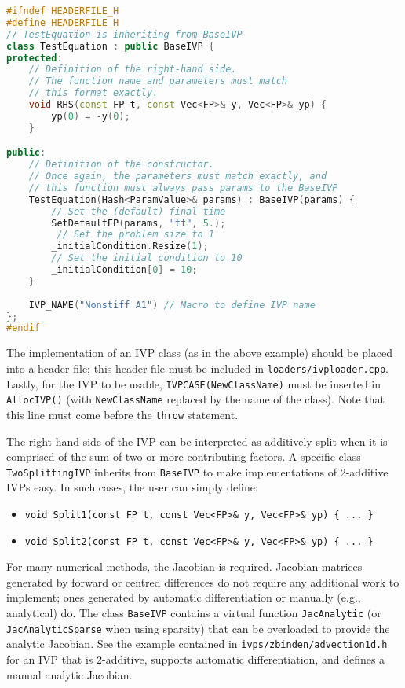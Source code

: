 \documentclass[11pt]{article}
\begin{document}
\begin{lstlisting}[tabsize=4,language=c++]
#ifndef HEADERFILE_H
#define HEADERFILE_H
// TestEquation is inheriting from BaseIVP
class TestEquation : public BaseIVP {	
protected: 
	// Definition of the right-hand side.
	// The function name and parameters must match
	// this format exactly.
	void RHS(const FP t, const Vec<FP>& y, Vec<FP>& yp) {
		yp(0) = -y(0);
	}

public:
	// Definition of the constructor.
	// Once again, the parameters must match exactly, and
	// this function must always pass params to the BaseIVP
	TestEquation(Hash<ParamValue>& params) : BaseIVP(params) {
		// Set the (default) final time
		SetDefaultFP(params, "tf", 5.);
		 // Set the problem size to 1
		_initialCondition.Resize(1);
		// Set the initial condition to 10
		_initialCondition[0] = 10;
	}
	
	IVP_NAME("Nonstiff A1") // Macro to define IVP name
};
#endif
\end{lstlisting}

The implementation of an IVP class (as in the above example) should be
placed into a header file; this header file must be included in
\verb=loaders/ivploader.cpp=. Lastly, for the IVP to be usable,
\verb=IVPCASE(NewClassName)= must be inserted in \verb=AllocIVP()= (with
\verb=NewClassName= replaced by the name of the class). Note that this
line must come before the \verb=throw= statement.

The right-hand side of the IVP can be interpreted as additively split
when it is comprised of the sum of two or more contributing factors. A
specific class \verb=TwoSplittingIVP= inherits from \verb=BaseIVP= to
make implementations of 2-additive IVPs easy. In such cases, the user can
simply define:
\begin{itemize}
\item \verb=void Split1(const FP t, const Vec<FP>& y, Vec<FP>& yp) { ... }=
\item \verb=void Split2(const FP t, const Vec<FP>& y, Vec<FP>& yp) { ... }=
\end{itemize}

For many numerical methods, the Jacobian is required. Jacobian
matrices generated by forward or centred differences do not require
any additional work to implement; ones generated by automatic
differentiation or manually (e.g., analytical) do. The class
\verb=BaseIVP= contains a virtual function \verb=JacAnalytic= (or
\verb=JacAnalyticSparse= when using sparsity) that can be overloaded
to provide the analytic Jacobian. See the example contained in
\verb=ivps/zbinden/advection1d.h= for an IVP that is 2-additive,
supports automatic differentiation, and defines a manual analytic
Jacobian.
\end{document}
